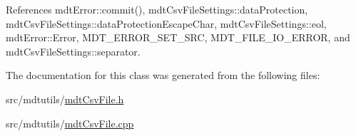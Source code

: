 References mdt\-Error\-::commit(), mdt\-Csv\-File\-Settings\-::data\-Protection, mdt\-Csv\-File\-Settings\-::data\-Protection\-Escape\-Char, mdt\-Csv\-File\-Settings\-::eol, mdt\-Error\-::\-Error, M\-D\-T\-\_\-\-E\-R\-R\-O\-R\-\_\-\-S\-E\-T\-\_\-\-S\-R\-C, M\-D\-T\-\_\-\-F\-I\-L\-E\-\_\-\-I\-O\-\_\-\-E\-R\-R\-O\-R, and mdt\-Csv\-File\-Settings\-::separator.



The documentation for this class was generated from the following files\-:\begin{DoxyCompactItemize}
\item 
src/mdtutils/\hyperlink{mdt_csv_file_8h}{mdt\-Csv\-File.\-h}\item 
src/mdtutils/\hyperlink{mdt_csv_file_8cpp}{mdt\-Csv\-File.\-cpp}\end{DoxyCompactItemize}
